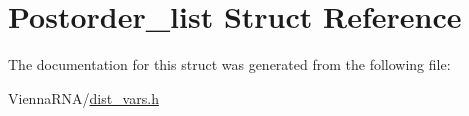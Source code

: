 \hypertarget{structPostorder__list}{}\section{Postorder\+\_\+list Struct Reference}
\label{structPostorder__list}


The documentation for this struct was generated from the following file\+:\begin{DoxyCompactItemize}
\item 
Vienna\+R\+N\+A/\hyperlink{dist__vars_8h}{dist\+\_\+vars.\+h}\end{DoxyCompactItemize}

